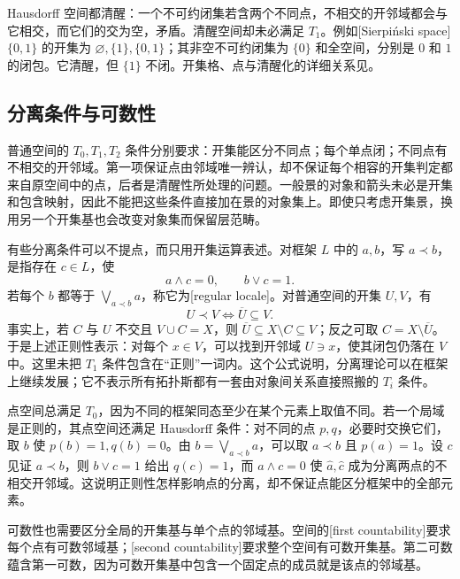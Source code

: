 \ProseParagraphBreak
Hausdorff 空间都清醒：一个不可约闭集若含两个不同点，不相交的开邻域都会与它相交，而它们的交为空，矛盾。清醒空间却未必满足 \(T_1\)。例如[Sierpiński space] \(\{0,1\}\) 的开集为 \(\varnothing,\{1\},\{0,1\}\)；其非空不可约闭集为 \(\{0\}\) 和全空间，分别是 \(0\) 和 \(1\) 的闭包。它清醒，但 \(\{1\}\) 不闭。开集格、点与清醒化的详细关系见\cite[Chapter IX, Sections 2--3]{MacLaneMoerdijk1992Sheaves}。

\subsection{分离条件与可数性}
\label{b4:subsec:locale-separation-countability}

普通空间的 \(T_0,T_1,T_2\) 条件分别要求：开集能区分不同点；每个单点闭；不同点有不相交的开邻域。第一项保证点由邻域唯一辨认，却不保证每个相容的开集判定都来自原空间中的点，后者是清醒性所处理的问题。一般景的对象和箭头未必是开集和包含映射，因此不能把这些条件直接加在景的对象集上。即使只考虑开集景，换用另一个开集基也会改变对象集而保留层范畴。

\ProseParagraphBreak
有些分离条件可以不提点，而只用开集运算表述。对框架 \(L\) 中的 \(a,b\)，写 \(a\prec b\)，是指存在 \(c\in L\)，使
\[
	a\wedge c=0,\qquad b\vee c=1.
\]
若每个 \(b\) 都等于 \(\bigvee_{a\prec b}a\)，称它为[regular locale]。对普通空间的开集 \(U,V\)，有
\[
	U\prec V\iff\overline U\subseteq V.
\]
事实上，若 \(C\) 与 \(U\) 不交且 \(V\cup C=X\)，则 \(\overline U\subseteq X\setminus C\subseteq V\)；反之可取 \(C=X\setminus\overline U\)。于是上述正则性表示：对每个 \(x\in V\)，可以找到开邻域 \(U\ni x\)，使其闭包仍落在 \(V\) 中。这里未把 \(T_1\) 条件包含在“正则”一词内。这个公式说明，分离理论可以在框架上继续发展；它不表示所有拓扑斯都有一套由对象间关系直接照搬的 \(T_i\) 条件。

\ProseParagraphBreak
点空间总满足 \(T_0\)，因为不同的框架同态至少在某个元素上取值不同。若一个局域是正则的，其点空间还满足 Hausdorff 条件：对不同的点 \(p,q\)，必要时交换它们，取 \(b\) 使 \(p(b)=1,q(b)=0\)。由 \(b=\bigvee_{a\prec b}a\)，可以取 \(a\prec b\) 且 \(p(a)=1\)。设 \(c\) 见证 \(a\prec b\)，则 \(b\vee c=1\) 给出 \(q(c)=1\)，而 \(a\wedge c=0\) 使 \(\widehat a,\widehat c\) 成为分离两点的不相交开邻域。这说明正则性怎样影响点的分离，却不保证点能区分框架中的全部元素。

\ProseParagraphBreak
可数性也需要区分全局的开集基与单个点的邻域基。空间的[first countability]要求每个点有可数邻域基；[second countability]要求整个空间有可数开集基。第二可数蕴含第一可数，因为可数开集基中包含一个固定点的成员就是该点的邻域基。

